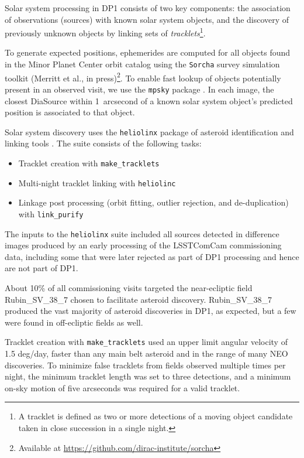 Solar system processing in \gls{DP1} consists of two key components: the association of observations (sources) with known solar system objects, and the discovery of previously unknown objects by linking sets of 
{\em tracklets}\footnote{A tracklet is defined as two or more detections of a moving object candidate taken in close succession in a single night.}.

To generate expected positions, ephemerides are computed for all objects found in the Minor Planet \gls{Center} orbit catalog using the \texttt{Sorcha} survey simulation toolkit (Merritt et al., in press)\footnote{Available at \url{https://github.com/dirac-institute/sorcha}}.
To enable fast lookup of objects potentially present in an observed visit, we use the {\tt mpsky} package \citep{mpsky}.
In each image, the closest DiaSource within 1~arcsecond of a known solar system object's predicted position is associated to that object.

Solar system discovery uses the {\tt heliolinx} package of asteroid identification and linking tools \citep{heliolinx}.
The suite consists of the following tasks:
\begin{itemize}
    \item Tracklet creation with {\tt make\_tracklets}
    \item Multi-night \gls{tracklet} linking with {\tt heliolinc}
    \item Linkage post processing (orbit fitting, outlier rejection, and de-duplication) with {\tt link\_purify}
\end{itemize}

The inputs to the {\tt heliolinx} suite included all sources detected in difference images produced by an early processing of the \gls{LSSTComCam} commissioning data,  including some that were later rejected as part of \gls{DP1} processing and hence are not part of \gls{DP1}.

About 10\% of all commissioning visits targeted the near-ecliptic field Rubin\_SV\_38\_7 chosen to facilitate asteroid discovery.
Rubin\_SV\_38\_7 produced the vast majority of asteroid discoveries in DP1, as expected, but a few were found in off-ecliptic fields as well.

Tracklet creation with {\tt make\_tracklets} used an upper limit angular velocity of 1.5 \gls{deg}/day, faster than any main belt asteroid and in the range of many \gls{NEO} discoveries.
To minimize false tracklets from fields observed multiple times per night, the minimum \gls{tracklet} length was set to three detections, and a minimum on-sky motion of five arcseconds was required for a valid \gls{tracklet}.

